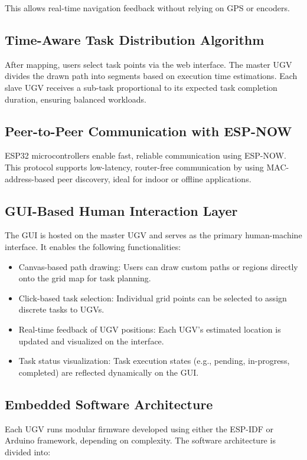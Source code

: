 \documentclass[conference]{IEEEtran}
\begin{document}
This allows real-time navigation feedback without relying on GPS or encoders.

\subsection{Time-Aware Task Distribution Algorithm}
After mapping, users select task points via the web interface. The master UGV divides the drawn path into segments based on execution time estimations. Each slave UGV receives a sub-task proportional to its expected task completion duration, ensuring balanced workloads.

\subsection{ Peer-to-Peer Communication with ESP-NOW}
ESP32 microcontrollers enable fast, reliable communication using ESP-NOW. This protocol supports low-latency, router-free communication by using MAC-address-based peer discovery, ideal for indoor or offline applications.

\subsection{ GUI-Based Human Interaction Layer}
The GUI is hosted on the master UGV and serves as the primary human-machine interface. It enables the following functionalities:

\begin{itemize}
    \item{Canvas-based path drawing:} Users can draw custom paths or regions directly onto the grid map for task planning.
    \item{Click-based task selection:} Individual grid points can be selected to assign discrete tasks to UGVs.
    \item {Real-time feedback of UGV positions:} Each UGV's estimated location is updated and visualized on the interface.
    \item {Task status visualization:} Task execution states (e.g., pending, in-progress, completed) are reflected dynamically on the GUI.
\end{itemize}

\subsection{Embedded Software Architecture}
Each UGV runs modular firmware developed using either the ESP-IDF or Arduino framework, depending on complexity. The software architecture is divided into:
\end{document}

